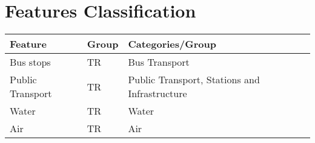 
\appendix
\chapter{Features Classification}
\label{appendices1}

\begin{table}[H]
\begin{tabular}{lll}
\hline
{\color[HTML]{000000} \textbf{Feature}}                            & {\color[HTML]{000000} \textbf{Group}} & {\color[HTML]{000000} \textbf{Categories/Group}}                                                                                                                                                                                                                                           \\ \hline
Bus stops                                                          & TR                                    & Bus Transport                                                                                                                                                                                                                                                                              \\ \hline
Public Transport                                                   & TR                                    & Public Transport, Stations and Infrastructure                                                                                                                                                                                                                                              \\ \hline
Water                                                              & TR                                    & Water                                                                                                                                                                                                                                                                                      \\ \hline
Air                                                                & TR                                    & Air                                                                                                                                                                                                                                                                                        \\ \hline

\end{tabular}
\end{table}
